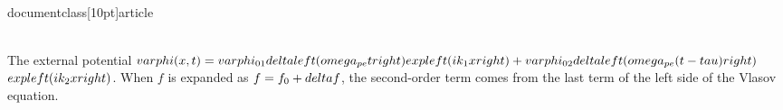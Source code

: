 \\documentclass[10pt]{article}
\begin{document}
{{{{{\\[
\\begin{array}{r}
\\frac{\\partial f(x, v, t)}{\\partial t}+v \\frac{\\partial f}{\\partial x}-\\frac{q}{m} \\frac{\\partial \\varphi}{\\partial x} \\frac{\\partial f}{\\partial v}=0 \\\\
\\frac{\\partial^{2} \\varphi}{\\partial x^{2}}=-\\frac{q}{\\epsilon_{0}}\\left(\\int \\mathrm{d} v f-1\\right)=-\\frac{q}{\\epsilon_{0}} \\int \\delta f \\tag{8.44}
\\end{array}
\\]

The external potential $\\varphi(x, t)=\\varphi_{01} \\delta\\left(\\omega_{p e} t\\right) \\exp \\left(i k_{1} x\\right)+\\varphi_{02} \\delta\\left(\\omega_{p e}(t-\\tau)\\right)$ $\\exp \\left(i k_{2} x\\right)$. When $f$ is expanded as $f=f_{0}+\\delta f$, the second-order term comes from the last term of the left side of the Vlasov equation.

}}}}}
\end{document}
